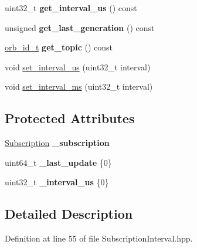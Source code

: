 \begin{DoxyCompactItemize}
uint32\+\_\+t {\bfseries get\+\_\+interval\+\_\+us} () const
\item 
\mbox{\label{classuORB_1_1SubscriptionInterval_a70f0db8ef87cbe335c01b7a24bb0eaf2}} 
unsigned {\bfseries get\+\_\+last\+\_\+generation} () const
\item 
\mbox{\label{classuORB_1_1SubscriptionInterval_a2e625fde36b8501430a7c0518521286f}} 
\hyperlink{structorb__metadata}{orb\+\_\+id\+\_\+t} {\bfseries get\+\_\+topic} () const
\item 
void \hyperlink{classuORB_1_1SubscriptionInterval_a53018b44bb431a80d47ac95327990b2a}{set\+\_\+interval\+\_\+us} (uint32\+\_\+t interval)
\item 
void \hyperlink{classuORB_1_1SubscriptionInterval_a12e68cbb4d69d82ec586aa2bbc8e9672}{set\+\_\+interval\+\_\+ms} (uint32\+\_\+t interval)
\end{DoxyCompactItemize}
\subsection*{Protected Attributes}
\begin{DoxyCompactItemize}
\item 
\mbox{\label{classuORB_1_1SubscriptionInterval_a9e90aab2e7af7acfc36282d438fa2741}} 
\hyperlink{classuORB_1_1Subscription}{Subscription} {\bfseries \+\_\+subscription}
\item 
\mbox{\label{classuORB_1_1SubscriptionInterval_ac1cdffa27e2a8393a2111a996b4f05bf}} 
uint64\+\_\+t {\bfseries \+\_\+last\+\_\+update} \{0\}
\item 
\mbox{\label{classuORB_1_1SubscriptionInterval_a01c7991b993e3851bc110b84dc485ed9}} 
uint32\+\_\+t {\bfseries \+\_\+interval\+\_\+us} \{0\}
\end{DoxyCompactItemize}


\subsection{Detailed Description}


Definition at line 55 of file Subscription\+Interval.\+hpp.



